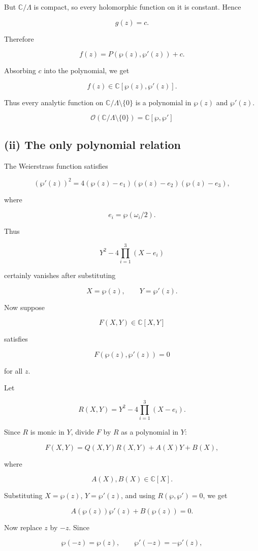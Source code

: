 \documentclass[12pt,a4paper]{article}
\theoremstyle{notespace}
\begin{document}
But \(\mathbb C/\Lambda\) is compact, so every holomorphic function on it is constant. Hence

\[
g(z)=c.
\]

Therefore

\[
f(z)=P(\wp(z),\wp'(z))+c.
\]

Absorbing \(c\) into the polynomial, we get

\[
f(z)\in \mathbb C[\wp(z),\wp'(z)].
\]

Thus every analytic function on \(\mathbb C/\Lambda\setminus\{0\}\) is a polynomial in \(\wp(z)\) and \(\wp'(z)\).

\[
\boxed{
	\mathcal O(\mathbb C/\Lambda\setminus\{0\})
	=
	\mathbb C[\wp,\wp']
}
\]

\subsection*{(ii) The only polynomial relation}

The Weierstrass function satisfies

\[
(\wp'(z))^2
=
4(\wp(z)-e_1)(\wp(z)-e_2)(\wp(z)-e_3),
\]

where

\[
e_i=\wp(\omega_i/2).
\]

Thus

\[
Y^2-4\prod_{i=1}^3(X-e_i)
\]

certainly vanishes after substituting

\[
X=\wp(z),
\qquad
Y=\wp'(z).
\]

Now suppose

\[
F(X,Y)\in \mathbb C[X,Y]
\]

satisfies

\[
F(\wp(z),\wp'(z))=0
\]

for all \(z\).

Let

\[
R(X,Y)=Y^2-4\prod_{i=1}^3(X-e_i).
\]

Since \(R\) is monic in \(Y\), divide \(F\) by \(R\) as a polynomial in \(Y\):

\[
F(X,Y)=Q(X,Y)R(X,Y)+A(X)Y+B(X),
\]

where

\[
A(X),B(X)\in \mathbb C[X].
\]

Substituting \(X=\wp(z)\), \(Y=\wp'(z)\), and using \(R(\wp,\wp')=0\), we get

\[
A(\wp(z))\wp'(z)+B(\wp(z))=0.
\]

Now replace \(z\) by \(-z\). Since

\[
\wp(-z)=\wp(z),
\qquad
\wp'(-z)=-\wp'(z),
\]
\end{document}

